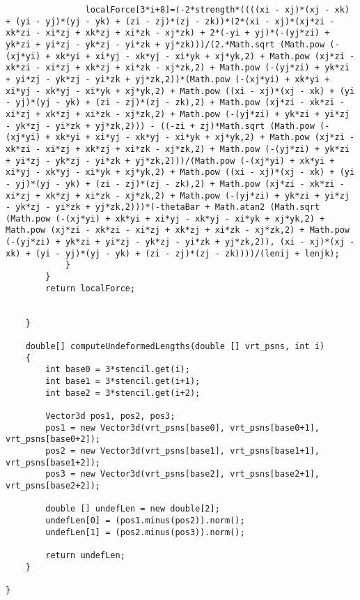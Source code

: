 \begin{lstlisting}
				localForce[3*i+8]=(-2*strength*((((xi - xj)*(xj - xk) + (yi - yj)*(yj - yk) + (zi - zj)*(zj - zk))*(2*(xi - xj)*(xj*zi - xk*zi - xi*zj + xk*zj + xi*zk - xj*zk) + 2*(-yi + yj)*(-(yj*zi) + yk*zi + yi*zj - yk*zj - yi*zk + yj*zk)))/(2.*Math.sqrt (Math.pow (-(xj*yi) + xk*yi + xi*yj - xk*yj - xi*yk + xj*yk,2) + Math.pow (xj*zi - xk*zi - xi*zj + xk*zj + xi*zk - xj*zk,2) + Math.pow (-(yj*zi) + yk*zi + yi*zj - yk*zj - yi*zk + yj*zk,2))*(Math.pow (-(xj*yi) + xk*yi + xi*yj - xk*yj - xi*yk + xj*yk,2) + Math.pow ((xi - xj)*(xj - xk) + (yi - yj)*(yj - yk) + (zi - zj)*(zj - zk),2) + Math.pow (xj*zi - xk*zi - xi*zj + xk*zj + xi*zk - xj*zk,2) + Math.pow (-(yj*zi) + yk*zi + yi*zj - yk*zj - yi*zk + yj*zk,2))) - ((-zi + zj)*Math.sqrt (Math.pow (-(xj*yi) + xk*yi + xi*yj - xk*yj - xi*yk + xj*yk,2) + Math.pow (xj*zi - xk*zi - xi*zj + xk*zj + xi*zk - xj*zk,2) + Math.pow (-(yj*zi) + yk*zi + yi*zj - yk*zj - yi*zk + yj*zk,2)))/(Math.pow (-(xj*yi) + xk*yi + xi*yj - xk*yj - xi*yk + xj*yk,2) + Math.pow ((xi - xj)*(xj - xk) + (yi - yj)*(yj - yk) + (zi - zj)*(zj - zk),2) + Math.pow (xj*zi - xk*zi - xi*zj + xk*zj + xi*zk - xj*zk,2) + Math.pow (-(yj*zi) + yk*zi + yi*zj - yk*zj - yi*zk + yj*zk,2)))*(-thetaBar + Math.atan2 (Math.sqrt (Math.pow (-(xj*yi) + xk*yi + xi*yj - xk*yj - xi*yk + xj*yk,2) + Math.pow (xj*zi - xk*zi - xi*zj + xk*zj + xi*zk - xj*zk,2) + Math.pow (-(yj*zi) + yk*zi + yi*zj - yk*zj - yi*zk + yj*zk,2)), (xi - xj)*(xj - xk) + (yi - yj)*(yj - yk) + (zi - zj)*(zj - zk))))/(lenij + lenjk);
			}
		}
		return localForce;
		
		
	}
	
	double[] computeUndeformedLengths(double [] vrt_psns, int i)
	{
		int base0 = 3*stencil.get(i);
		int base1 = 3*stencil.get(i+1);
		int base2 = 3*stencil.get(i+2);
		
		Vector3d pos1, pos2, pos3;
		pos1 = new Vector3d(vrt_psns[base0], vrt_psns[base0+1], vrt_psns[base0+2]);
		pos2 = new Vector3d(vrt_psns[base1], vrt_psns[base1+1], vrt_psns[base1+2]);
		pos3 = new Vector3d(vrt_psns[base2], vrt_psns[base2+1], vrt_psns[base2+2]);
		
		double [] undefLen = new double[2];
		undefLen[0] = (pos1.minus(pos2)).norm();
		undefLen[1] = (pos2.minus(pos3)).norm();
		
		return undefLen;
	}
	
}
\end{lstlisting}

